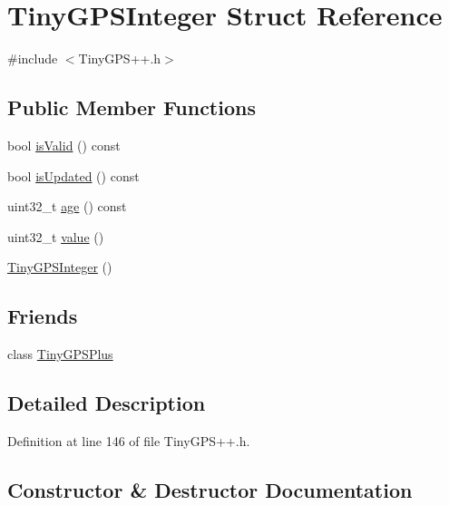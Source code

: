 \hypertarget{struct_tiny_g_p_s_integer}{}\section{Tiny\+G\+P\+S\+Integer Struct Reference}
\label{struct_tiny_g_p_s_integer}


{\ttfamily \#include $<$Tiny\+G\+P\+S++.\+h$>$}

\subsection*{Public Member Functions}
\begin{DoxyCompactItemize}
\item 
bool \hyperlink{struct_tiny_g_p_s_integer_aad411b5eb6cc16774ff0ff8d275df2fa}{is\+Valid} () const 
\item 
bool \hyperlink{struct_tiny_g_p_s_integer_aa6479670272df580287f84938183dc20}{is\+Updated} () const 
\item 
uint32\+\_\+t \hyperlink{struct_tiny_g_p_s_integer_a46ea8f4fe8cca279b7d4cd44572e5881}{age} () const 
\item 
uint32\+\_\+t \hyperlink{struct_tiny_g_p_s_integer_a67de7e76d61dbd25eb32f701d8ce867b}{value} ()
\item 
\hyperlink{struct_tiny_g_p_s_integer_a017a71970fa652964a9e71b7ec945cec}{Tiny\+G\+P\+S\+Integer} ()
\end{DoxyCompactItemize}
\subsection*{Friends}
\begin{DoxyCompactItemize}
\item 
class \hyperlink{struct_tiny_g_p_s_integer_a6501fd5ef19ae166d43e0e5781609ee2}{Tiny\+G\+P\+S\+Plus}
\end{DoxyCompactItemize}


\subsection{Detailed Description}


Definition at line 146 of file Tiny\+G\+P\+S++.\+h.



\subsection{Constructor \& Destructor Documentation}
